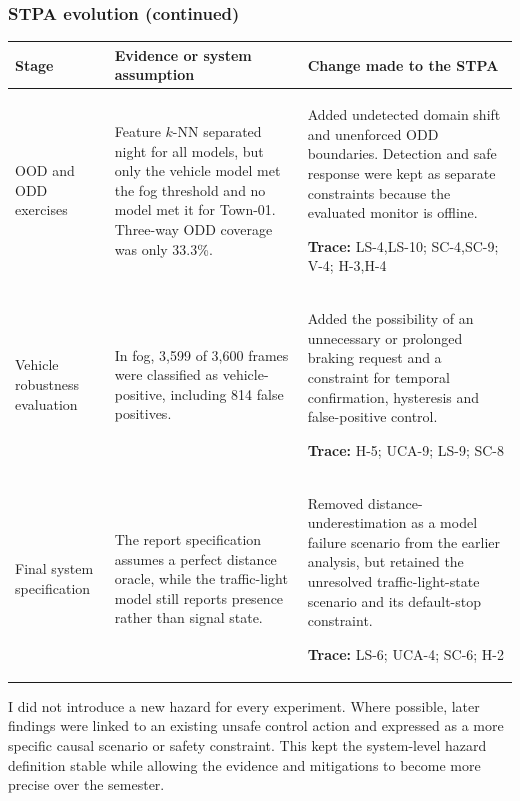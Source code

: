 \documentclass[nologo,a4paper,12pt]{article}
\begin{document}
\clearpage
\subsubsection*{STPA evolution (continued)}

{\small
\renewcommand{\arraystretch}{1.08}
\begin{tabularx}{\linewidth}{@{}>{\raggedright\arraybackslash}p{2.55cm}>{\raggedright\arraybackslash}p{5.25cm}Y@{}}
\toprule
\textbf{Stage} & \textbf{Evidence or system assumption} & \textbf{Change made to the STPA} \\
\midrule

OOD and ODD exercises
& Feature $k$-NN separated night for all models, but only the vehicle model met the fog threshold
and no model met it for Town-01. Three-way ODD coverage was only 33.3\%.
& Added undetected domain shift and unenforced ODD boundaries. Detection and safe response were
kept as separate constraints because the evaluated monitor is offline.\par\smallskip
\textbf{Trace:} LS-4,LS-10; SC-4,SC-9; V-4; H-3,H-4 \\
\addlinespace[0.65em]

Vehicle robustness evaluation
& In fog, 3,599 of 3,600 frames were classified as vehicle-positive, including 814 false
positives.
& Added the possibility of an unnecessary or prolonged braking request and a constraint for
temporal confirmation, hysteresis and false-positive control.\par\smallskip
\textbf{Trace:} H-5; UCA-9; LS-9; SC-8 \\
\addlinespace[0.65em]

Final system specification
& The report specification assumes a perfect distance oracle, while the traffic-light model still
reports presence rather than signal state.
& Removed distance-underestimation as a model failure scenario from the earlier analysis, but
retained the unresolved traffic-light-state scenario and its default-stop constraint.\par\smallskip
\textbf{Trace:} LS-6; UCA-4; SC-6; H-2 \\
\bottomrule
\end{tabularx}}

I did not introduce a new hazard for every experiment. Where possible, later findings were linked
to an existing unsafe control action and expressed as a more specific causal scenario or safety
constraint. This kept the system-level hazard definition stable while allowing the evidence and
mitigations to become more precise over the semester.
\end{document}
